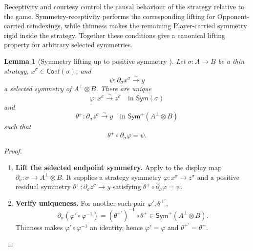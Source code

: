 \documentclass[oneside]{article}
\newcommand{\Conf}{\mathsf{Conf}}
\newcommand{\Sym}{\mathsf{Sym}}
\theoremstyle{plain}
\newtheorem{lemma}[theorem]{Lemma}
\theoremstyle{definition}
\theoremstyle{remark}
\begin{document}
Receptivity and courtesy control the causal behaviour of the strategy relative to the game. Symmetry-receptivity performs the corresponding lifting for Opponent-carried reindexings, while thinness makes the remaining Player-carried symmetry rigid inside the strategy. Together these conditions give a canonical lifting property for arbitrary selected symmetries.

\begin{lemma}[Symmetry lifting up to positive symmetry
{\cite[Lemma~5.5]{ClairambaultOlimpieriPaquet2025}}]
\label{lem:cgqg-background-strategy-symmetry-lifting}
    Let \(\sigma:A\to B\) be a thin strategy, \(x^\sigma\in\Conf(\sigma)\), and
    \[
        \psi:
        \partial_\sigma x^\sigma
        \xrightarrow{\sim}
        y
    \]
    a selected symmetry of \(A^\perp\otimes B\). There are unique
    \[
        \varphi:
        x^\sigma\xrightarrow{\sim}z^\sigma
        \quad\text{in }\Sym(\sigma)
    \]
    and
    \[
        \theta^+:
        \partial_\sigma z^\sigma
        \xrightarrow{\sim} y
        \quad\text{in }\Sym^+(A^\perp\otimes B)
    \]
    such that
    \begin{equation}
        \theta^+\circ\partial_\sigma\varphi=\psi.
    \label{eq:cgqg-background-strategy-symmetry-lifting}
    \end{equation}
\end{lemma}
\begin{proof}
    \leavevmode
    \begin{enumerate}[beginpenalty=10000]
        \item \textbf{Lift the selected endpoint symmetry.} Apply \cite[Lemma~5.5]{ClairambaultOlimpieriPaquet2025} to the display map \(\partial_\sigma:\sigma\to A^\perp\otimes B\). It supplies a strategy symmetry \(\varphi:x^\sigma\to z^\sigma\) and a positive residual symmetry \(\theta^+:\partial_\sigma z^\sigma\to y\) satisfying \(\theta^+\circ\partial_\sigma\varphi=\psi\).

        \item \textbf{Verify uniqueness.} For another such pair \(\varphi',\theta^{+\prime}\),
        \[
            \partial_\sigma(\varphi'\circ\varphi^{-1})
              =(\theta^{+\prime})^{-1}\circ\theta^+
              \in\Sym^+(A^\perp\otimes B).
        \]
        Thinness makes \(\varphi'\circ\varphi^{-1}\) an identity, hence
        \(\varphi'=\varphi\) and \(\theta^{+\prime}=\theta^+\). \qedhere
    \end{enumerate}
\end{proof}
\end{document}
